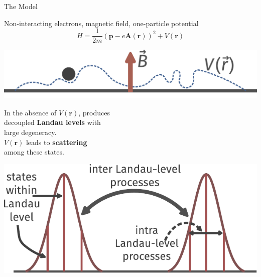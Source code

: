 \documentclass[11pt,aspectratio=169]{beamer}
\newcommand\focus[1]{%
	{\alert{\textbf{#1}}}
}
\begin{document}
\begin{frame}{The Model}
	\begin{minipage}{0.45\textwidth}
	Non-interacting electrons, magnetic field, one-particle potential
	\[H = \frac{1}{2m}\left({\mathbf p} - e{\mathbf A({\mathbf r})}\right)^2 + V({\mathbf r})\]
	\end{minipage}
	\begin{minipage}{0.5\textwidth}
	\includegraphics[width=\textwidth]{iqheModel.pdf}
	\end{minipage}

	\vspace{\fill}
	\begin{minipage}{0.45\textwidth}
		In the absence of \(V({\mathbf r})\), produces \\
		decoupled \focus{Landau levels} with\\
		large degeneracy.\\

		\(V({\mathbf r})\) leads to \focus{scattering} \\
		among these states.
	\end{minipage}
	\begin{minipage}{0.5\textwidth}
	\includegraphics[width=\textwidth]{landauLevels.pdf}
	\end{minipage}
\end{frame}
\end{document}

